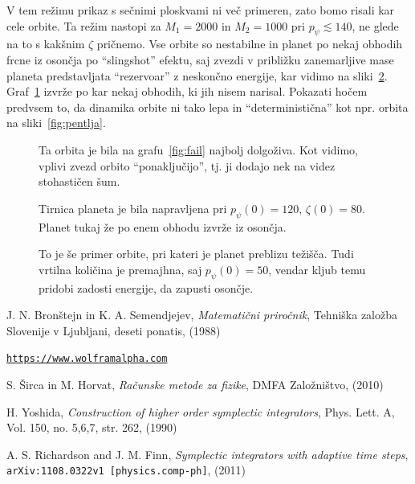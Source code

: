 \documentclass[12pt, a4paper]{article}
\begin{document}
V tem re\v zimu prikaz s se\v cnimi ploskvami ni ve\v c primeren, zato bomo risali kar cele orbite. Ta
re\v zim nastopi za $M_1 = 2000$ in $M_2 = 1000$ pri $p_\psi \lesssim 140$, ne glede na to s kak\v snim
$\zeta$ pri\v cnemo. Vse orbite so nestabilne in planet po nekaj obhodih frcne iz oson\v cja po
"`slingshot"' efektu, saj zvezdi v pribli\v zku zanemarljive mase planeta predstavljata "`rezervoar"'
z neskon\v cno energije, kar vidimo na sliki~\ref{fig:unstable2}. Graf~\ref{fig:unstable} izvr\v ze po
kar nekaj obhodih, ki jih nisem narisal. Pokazati ho\v cem predvsem to, da dinamika orbite ni tako lepa
in "`deterministi\v cna"' kot npr. orbita na sliki~\ref{fig:pentlja}.

\begin{figure}[H]\centering
	
	\caption{Ta orbita je bila na grafu~\ref{fig:fail} najbolj dolgo\v ziva. Kot vidimo, vplivi zvezd orbito
		"`ponaklju\v cijo"', tj. ji dodajo nek na videz stohasti\v cen \v sum.}
	\label{fig:unstable}
\end{figure}

\begin{figure}[H]\centering
	
	\caption{Tirnica planeta je bila napravljena pri $p_\psi(0) = 120$, $\zeta(0) = 80$. Planet tukaj \v ze po enem
		obhodu izvr\v ze iz oson\v cja.}
	\label{fig:unstable2}
\end{figure}

\begin{figure}[H]\centering
	
	\caption{To je \v se primer orbite, pri kateri je planet preblizu te\v zi\v s\v ca. Tudi vrtilna koli\v cina
		je premajhna, saj $p_\psi (0) = 50$, vendar kljub temu pridobi zadosti energije, da zapusti oson\v cje.}
	\label{fig:unstable3}
\end{figure}

\begin{thebibliography}{9}
		J. N. Bron\v stejn in K. A. Semendjejev,
		{\em Matemati\v cni priro\v cnik},
		Tehni\v ska zalo\v zba Slovenije v Ljubljani,
		deseti ponatis,
		(1988)

		\href{https://www.wolframalpha.com/input/?i=series\%20representations\%20incomplete\%20elliptic\%20integrals\&lk=2}
			{{\tt https://www.wolframalpha.com}}

        S. \v Sirca in M. Horvat,
        {\em Ra\v cunske metode za fizike},
        DMFA Zalo\v zni\v stvo,
        (2010)

        H. Yoshida,
        \emph{Construction of higher order symplectic integrators},
        Phys. Lett. A,
        Vol. 150, no. 5,6,7, str. 262,
        (1990)

        A. S. Richardson and J. M. Finn,
        \emph{Symplectic integrators with adaptive time steps},
        {\tt arXiv:1108.0322v1 [physics.comp-ph]},
        (2011)
\end{thebibliography}
\end{document}
